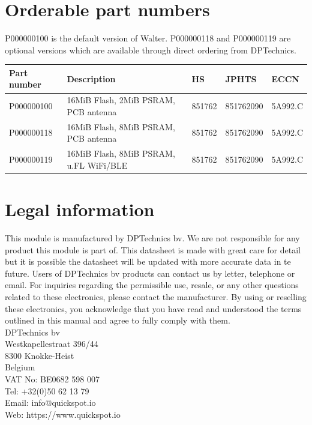 \documentclass[11pt]{article}
\begin{document}
\section{Orderable part numbers} \label{orderable_parts}
P000000100 is the default version of Walter. P000000118 and P000000119 are optional versions which are available through direct ordering from DPTechnics.
\begin{center}
\renewcommand{\arraystretch}{1.5}
\begin{tabular}{|l|l|l|l|l|}
\hline
{\bf Part number} & {\bf Description} & {\bf HS} & {\bf JPHTS} & {\bf ECCN} \\
\hline
\hline
P000000100 & 16MiB Flash, 2MiB PSRAM, PCB antenna & 851762 & 851762090 & 5A992.C \\
\hline
P000000118 & 16MiB Flash, 8MiB PSRAM, PCB antenna & 851762 & 851762090 & 5A992.C \\
\hline
P000000119 & 16MiB Flash, 8MiB PSRAM, u.FL WiFi/BLE & 851762 & 851762090 & 5A992.C \\
\hline
\end{tabular}
\end{center}

\section{Legal information}
This module is manufactured by DPTechnics bv. We are not responsible for any product this module is part of. This datasheet is made with great care for detail but it is possible the datasheet will be updated with more accurate data in te future. Users of DPTechnics bv products can contact us by letter, telephone or email. For inquiries regarding the permissible use, resale, or any other questions related to these electronics, please contact the manufacturer. By using or reselling these electronics, you acknowledge that you have read and understood the terms outlined in this manual and agree to fully comply with them.\\

\noindent DPTechnics bv\\
Westkapellestraat 396/44\\
8300 Knokke-Heist\\
Belgium\\

VAT No: BE0682 598 007\\

\noindent Tel: +32(0)50 62 13 79\\
Email: info@quickspot.io\\
Web: https://www.quickspot.io
\end{document}
